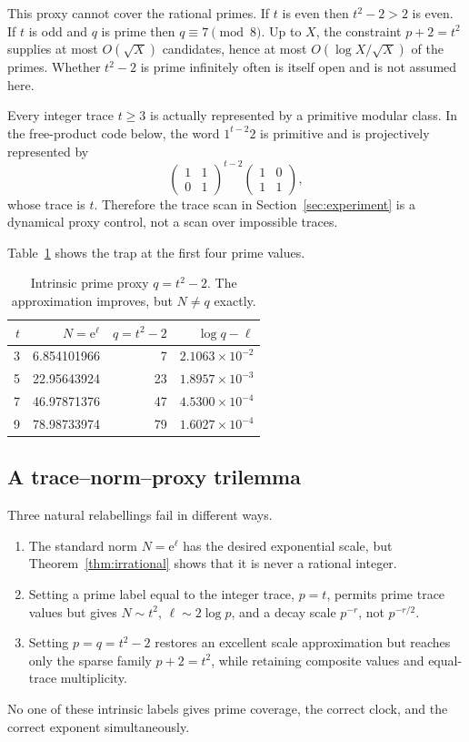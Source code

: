 \documentclass[11pt]{article}
\theoremstyle{definition}
\theoremstyle{remark}
\newcommand{\e}{\mathrm{e}}
\begin{document}
This proxy cannot cover the rational primes.  If \(t\) is even then
\(t^2-2>2\) is even.  If \(t\) is odd and \(q\) is prime then
\(q\equiv7\pmod 8\).  Up to \(X\), the constraint \(p+2=t^2\) supplies at
most \(O(\sqrt X)\) candidates, hence at most
\(O(\log X/\sqrt X)\) of the primes.  Whether \(t^2-2\) is prime infinitely
often is itself open and is not assumed here.

Every integer trace \(t\ge3\) is actually represented by a primitive modular
class.  In the free-product code below, the word \(1^{t-2}2\) is primitive and
is projectively represented by
\[
 \begin{pmatrix}1&1\\0&1\end{pmatrix}^{t-2}
 \begin{pmatrix}1&0\\1&1\end{pmatrix},
\]
whose trace is \(t\).  Therefore the trace scan in Section~\ref{sec:experiment}
is a dynamical proxy control, not a scan over impossible traces.

Table~\ref{tab:proxyexamples} shows the trap at the first four prime values.

\begin{table}[ht]
\centering
\caption{Intrinsic prime proxy \(q=t^2-2\).  The approximation improves, but
\(N\ne q\) exactly.}
\label{tab:proxyexamples}
\begin{tabular}{rrrr}
\toprule
\(t\) & \(N=\e^\ell\) & \(q=t^2-2\) & \(\log q-\ell\)\\
\midrule
3 & 6.854101966 & 7  & \(2.1063\times10^{-2}\)\\
5 & 22.95643924 & 23 & \(1.8957\times10^{-3}\)\\
7 & 46.97871376 & 47 & \(4.5300\times10^{-4}\)\\
9 & 78.98733974 & 79 & \(1.6027\times10^{-4}\)\\
\bottomrule
\end{tabular}
\end{table}

\subsection{A trace--norm--proxy trilemma}

Three natural relabellings fail in different ways.
\begin{enumerate}[leftmargin=*]
 \item The standard norm \(N=\e^\ell\) has the desired exponential scale,
 but Theorem~\ref{thm:irrational} shows that it is never a rational integer.
 \item Setting a prime label equal to the integer trace, \(p=t\), permits
 prime trace values but gives \(N\sim t^2\), \(\ell\sim2\log p\), and a
 decay scale \(p^{-r}\), not \(p^{-r/2}\).
 \item Setting \(p=q=t^2-2\) restores an excellent scale approximation but
 reaches only the sparse family \(p+2=t^2\), while retaining composite values
 and equal-trace multiplicity.
\end{enumerate}
No one of these intrinsic labels gives prime coverage, the correct clock, and
the correct exponent simultaneously.
\end{document}
